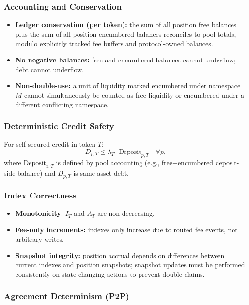 \documentclass[version=preprint]{iacrcc}
\begin{document}
\subsubsection{Accounting and Conservation}

\begin{itemize}
  \item \textbf{Ledger conservation (per token):} the sum of all position free balances plus the sum of all position encumbered balances reconciles to pool totals, modulo explicitly tracked fee buffers and protocol-owned balances.
  \item \textbf{No negative balances:} free and encumbered balances cannot underflow; debt cannot underflow.
  \item \textbf{Non-double-use:} a unit of liquidity marked encumbered under namespace $M$ cannot simultaneously be counted as free liquidity or encumbered under a different conflicting namespace.
\end{itemize}

\subsubsection{Deterministic Credit Safety}

For self-secured credit in token $T$:
\[
D_{p,T} \le \lambda_T \cdot \text{Deposit}_{p,T}
\quad \forall p,
\]
where $\text{Deposit}_{p,T}$ is defined by pool accounting (e.g., free+encumbered deposit-side balance) and $D_{p,T}$ is same-asset debt.

\subsubsection{Index Correctness}

\begin{itemize}
  \item \textbf{Monotonicity:} $I_T$ and $A_T$ are non-decreasing.
  \item \textbf{Fee-only increments:} indexes only increase due to routed fee events, not arbitrary writes.
  \item \textbf{Snapshot integrity:} position accrual depends on differences between current indexes and position snapshots; snapshot updates must be performed consistently on state-changing actions to prevent double-claims.
\end{itemize}

\subsubsection{Agreement Determinism (P2P)}
\end{document}
